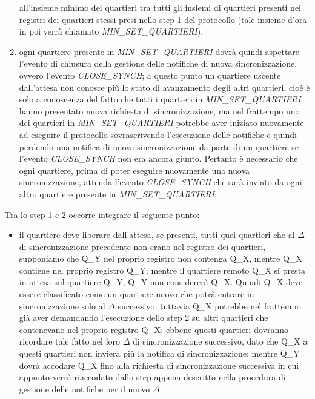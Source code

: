 \begin{enumerate}
all'insieme minimo dei quartieri tra tutti gli insiemi di quartieri presenti
nei registri dei quartieri stessi presi nello step 1 del protocollo (tale
insieme d'ora in poi verrà chiamato \textit{MIN\_SET\_QUARTIERI}). \\
\item ogni quartiere presente in \textit{MIN\_SET\_QUARTIERI} dovrà quindi
aspettare l'evento di chiusura della gestione delle notifiche di nuova
sincronizzazione, ovvero l'evento \textit{CLOSE\_SYNCH}; a questo punto un
quartiere uscente dall'attesa non conosce più lo stato di avanzamento degli
altri quartieri, cioè è solo a conoscenza del fatto che tutti i quartieri in
\textit{MIN\_SET\_QUARTIERI} hanno presentato nuova richiesta di
sincronizzazione, ma nel frattempo uno dei quartieri in
\textit{MIN\_SET\_QUARTIERI} potrebbe aver iniziato nuovamente ad eseguire il
protocollo sovrascrivendo l'esecuzione delle notifiche e quindi perdendo una
notifica di nuova sincronizzazione da parte di un quartiere se l'evento
\textit{CLOSE\_SYNCH} non era ancora giunto. Pertanto è necessario che ogni
quartiere, prima di poter eseguire nuovamente una nuova sincronizzazione,
attenda l'evento \textit{CLOSE\_SYNCH} che sarà inviato da ogni altro quartiere
presente in \textit{MIN\_SET\_QUARTIERI};
\end{enumerate}
Tra lo step 1 e 2 occorre integrare il seguente punto:  
\begin{itemize}
\item il quartiere deve liberare dall'attesa, se presenti, tutti quei quartieri
che al $\Delta$ di sincronizzazione precedente non erano nel registro dei
quartieri, supponiamo che Q\_Y nel proprio registro non contenga Q\_X, mentre
Q\_X contiene nel proprio registro Q\_Y; mentre il quartiere remoto Q\_X si
presta in attesa sul quartiere Q\_Y, Q\_Y non considererà Q\_X. Quindi Q\_X
deve essere classificato come un quartiere nuovo che potrà entrare in
sincronizzazione solo al $\Delta$ successivo; tuttavia Q\_X potrebbe nel
frattempo già aver demandando l'esecuzione dello step 2 su altri quartieri che
contenevano nel proprio registro Q\_X; ebbene questi quartieri dovranno
ricordare tale fatto nel loro $\Delta$ di sincronizzazione successivo, dato che
Q\_X a questi quartieri non invierà più la notifica di sincronizzazione; mentre
Q\_Y dovrà accodare Q\_X fino alla richiesta di sincronizzazione successiva in
cui appunto verrà riaccodato dallo step appena descritto nella procedura di
gestione delle notifiche per il nuovo $\Delta$.
\end{itemize}

